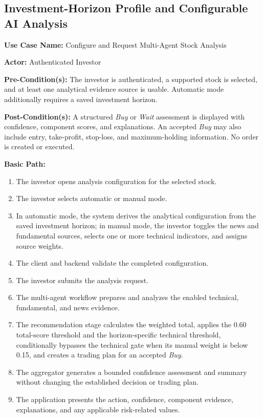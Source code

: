 \subsection{Investment-Horizon Profile and Configurable AI Analysis}
\label{subsec:configurable-ai-analysis}

\noindent\textbf{Use Case Name:} Configure and Request Multi-Agent Stock Analysis

\noindent\textbf{Actor:} Authenticated Investor

\noindent\textbf{Pre-Condition(s):} The investor is authenticated, a supported stock is selected, and at least one analytical evidence source is usable. Automatic mode additionally requires a saved investment horizon.

\noindent\textbf{Post-Condition(s):} A structured \textit{Buy} or \textit{Wait} assessment is displayed with confidence, component scores, and explanations. An accepted \textit{Buy} may also include entry, take-profit, stop-loss, and maximum-holding information. No order is created or executed.

\noindent\textbf{Basic Path:}
\begin{enumerate}[leftmargin=*, nosep]
    \item The investor opens analysis configuration for the selected stock.
    \item The investor selects automatic or manual mode.
    \item In automatic mode, the system derives the analytical configuration from the saved investment horizon; in manual mode, the investor toggles the news and fundamental sources, selects one or more technical indicators, and assigns source weights.
    \item The client and backend validate the completed configuration.
    \item The investor submits the analysis request.
    \item The multi-agent workflow prepares and analyzes the enabled technical, fundamental, and news evidence.
    \item The recommendation stage calculates the weighted total, applies the 0.60 total-score threshold and the horizon-specific technical threshold, conditionally bypasses the technical gate when its manual weight is below 0.15, and creates a trading plan for an accepted \textit{Buy}.
    \item The aggregator generates a bounded confidence assessment and summary without changing the established decision or trading plan.
    \item The application presents the action, confidence, component evidence, explanations, and any applicable risk-related values.
\end{enumerate}

